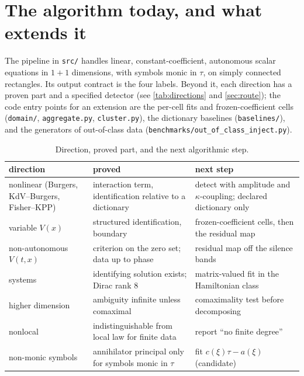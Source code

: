 \section{The algorithm today, and what extends it}\label{sec:algo-state}
The pipeline in \texttt{src/} handles linear, constant-coefficient, autonomous scalar equations in $1{+}1$ dimensions, with symbols monic in $\tau$, on simply connected rectangles. Its output contract is the four labels. Beyond it, each direction has a proven part and a specified detector (see \cref{tab:directions} and \cref{sec:route}); the code entry points for an extension are the per-cell fits and frozen-coefficient cells (\texttt{domain/}, \texttt{aggregate.py}, \texttt{cluster.py}), the dictionary baselines (\texttt{baselines/}), and the generators of out-of-class data (\texttt{benchmarks/out\_of\_class\_inject.py}).
\begin{table}[tbp]
\centering\small
\caption{Direction, proved part, and the next algorithmic step.}\label{tab:algo-next}
\begin{tabular}{@{}p{2.5cm}p{4.5cm}p{4.8cm}@{}}
\toprule
direction & proved & next step\\
\midrule
nonlinear (Burgers, KdV--Burgers, Fisher--KPP) & interaction term, identification relative to a dictionary & detect with amplitude and $\kappa$-coupling; declared dictionary only\\
variable $V(x)$ & structured identification, boundary & frozen-coefficient cells, then the residual map\\
non-autonomous $V(t,x)$ & criterion on the zero set; data up to phase & residual map off the silence bands\\
systems & identifying solution exists; Dirac rank 8 & matrix-valued fit in the Hamiltonian class\\
higher dimension & ambiguity infinite unless comaximal & comaximality test before decomposing\\
nonlocal & indistinguishable from local law for finite data & report \UND{} ``no finite degree''\\
non-monic symbols & annihilator principal only for symbols monic in $\tau$ & fit $c(\xi)\tau-a(\xi)$ (candidate)\\
\bottomrule
\end{tabular}
\end{table}
